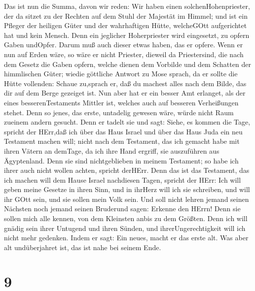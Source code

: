  Das ist nun die Summa, davon wir reden: Wir haben einen
solchenHohenpriester, der da sitzet zu der Rechten auf dem Stuhl der
Majestät im Himmel;  und ist ein Pfleger der heiligen Güter
und der wahrhaftigen Hütte, welcheGOtt aufgerichtet hat und kein Mensch.
 Denn ein jeglicher Hoherpriester wird eingesetzt, zu opfern
Gaben undOpfer. Darum muß auch dieser etwas haben, das er opfere.
 Wenn er nun auf Erden wäre, so wäre er nicht Priester,
dieweil da Priestersind, die nach dem Gesetz die Gaben opfern,
 welche dienen dem Vorbilde und dem Schatten der himmlischen
Güter; wiedie göttliche Antwort zu Mose sprach, da er sollte die Hütte
vollenden: Schaue zu,sprach er, daß du machest alles nach dem Bilde, das
dir auf dem Berge gezeiget ist.  Nun aber hat er ein besser
Amt erlanget, als der eines besserenTestaments Mittler ist, welches auch
auf besseren Verheißungen stehet.  Denn so jenes, das erste,
untadelig gewesen wäre, würde nicht Raum zueinem andern gesucht.
 Denn er tadelt sie und sagt: Siehe, es kommen die Tage,
spricht der HErr,daß ich über das Haus Israel und über das Haus Juda ein
neu Testament machen will;  nicht nach dem Testament, das
ich gemacht habe mit ihren Vätern an demTage, da ich ihre Hand ergriff,
sie auszuführen aus Ägyptenland. Denn sie sind nichtgeblieben in meinem
Testament; so habe ich ihrer auch nicht wollen achten, spricht derHErr.
 Denn das ist das Testament, das ich machen will dem Hause
Israel nachdiesen Tagen, spricht der HErr: Ich will geben meine Gesetze
in ihren Sinn, und in ihrHerz will ich sie schreiben, und will ihr GOtt
sein, und sie sollen mein Volk sein.  Und soll nicht lehren
jemand seinen Nächsten noch jemand seinen Bruderund sagen: Erkenne den
HErrn! Denn sie sollen mich alle kennen, von dem Kleinsten anbis zu dem
Größten.  Denn ich will gnädig sein ihrer Untugend und
ihren Sünden, und ihrerUngerechtigkeit will ich nicht mehr gedenken.
 Indem er sagt: Ein neues, macht er das erste alt. Was aber
alt undüberjahret ist, das ist nahe bei seinem Ende.

\hypertarget{section-7}{%
\section{9}\label{section-7}}

